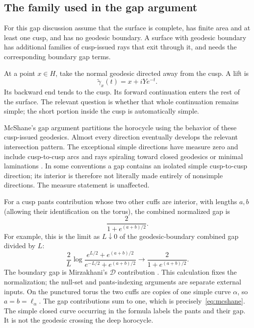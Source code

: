 \subsection{The family used in the gap argument}

For this gap discussion assume that the surface is complete, has finite
area and at least one cusp, and has no geodesic boundary. A surface with
geodesic boundary has additional families of cusp-issued rays that exit
through it, and needs the corresponding boundary gap terms.

At a point $x\in H$, take the normal geodesic directed away from the
cusp. A lift is
\begin{equation}
 \widetilde\gamma_x(t)=x+iYe^{-t}.
 \label{eq:cuspray}
\end{equation}
Its backward end tends to the cusp. Its forward continuation enters the
rest of the surface. The relevant question is whether that whole
continuation remains simple; the short portion inside the cusp is
automatically simple.

McShane's gap argument partitions the horocycle using the behavior of
these cusp-issued geodesics. Almost every direction eventually develops
the relevant intersection pattern. The exceptional simple directions
have measure zero and include cusp-to-cusp arcs and rays spiraling toward
closed geodesics or minimal laminations
\cite{McShane}\cite[Theorem 3, p.~4, and the paragraph after
Corollary 5, p.~5]{McShanePants}.
In some conventions a gap contains an isolated simple cusp-to-cusp
direction; its interior is therefore not literally made entirely of
nonsimple directions. The measure statement is unaffected.

For a cusp pants contribution whose two other cuffs are interior, with
lengths $a,b$ (allowing their identification on the torus), the combined
normalized gap is
\begin{equation}
 \frac{2}{1+e^{(a+b)/2}}.
 \label{eq:cuspgap}
\end{equation}
For example, this is the limit as $L\downarrow0$ of the geodesic-boundary
combined gap divided by $L$:
\[
 \frac{2}{L}\log
 \frac{e^{L/2}+e^{(a+b)/2}}{e^{-L/2}+e^{(a+b)/2}}
 \longrightarrow \frac{2}{1+e^{(a+b)/2}}.
\]
The boundary gap is Mirzakhani's $\mathcal D$ contribution
\cite[Lemma 3.1, equation (3.1), and Theorem 4.2]{MirzVolumes}. This calculation fixes the
normalization; the null-set and pants-indexing arguments are separate
external inputs.
On the punctured torus the two cuffs are copies of one simple curve
$\alpha$, so $a=b=\ell_\alpha$. The gap contributions sum to one,
which is precisely~\eqref{eq:mcshane}. The simple closed curve occurring
in the formula labels the pants and their gap. It is not the geodesic
crossing the deep horocycle.

